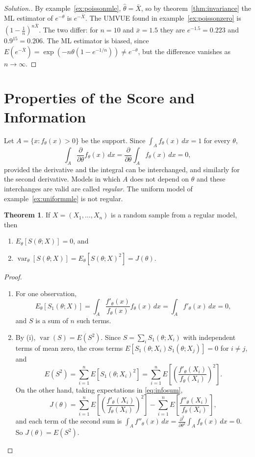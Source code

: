 \documentclass[12pt,a4paper]{report}
\theoremstyle{definition}
\newtheorem{thm}{Theorem}[section]
\DeclareMathOperator{\var}{var}
\newenvironment{solution}
  {\renewcommand{\qedsymbol}{}\begin{proof}[\textit{Solution}.]}
  {\end{proof}}
\begin{document}
\begin{solution}
By example~\ref{ex:poissonmle}, $\hat\theta = \bar X$, so by
theorem~\ref{thm:invariance} the ML estimator of $e^{-\theta}$ is $e^{-\bar X}$. The
UMVUE found in example~\ref{ex:poissonzero} is $\left(1 - \frac1n\right)^{n\bar X}$. The
two differ: for $n = 10$ and $\bar x = 1.5$ they are $e^{-1.5} = 0.223$ and
$0.9^{15} = 0.206$. The ML estimator is biased, since
$E\left(e^{-\bar X}\right) = \exp\left(-n\theta(1 - e^{-1/n})\right)\ne e^{-\theta}$, but
the difference vanishes as $n\to\infty$.
\end{solution}

\section{Properties of the Score and Information}

Let $A = \{x : f_\theta(x)>0\}$ be the support. Since $\int_A f_\theta(x)\,dx = 1$
for every $\theta$,
\[\int_A\frac{\partial}{\partial\theta}f_\theta(x)\,dx = \frac{\partial}{\partial\theta}\int_A f_\theta(x)\,dx = 0,\]
provided the derivative and the integral can be interchanged, and similarly for
the second derivative. Models in which $A$ does not depend on $\theta$ and these
interchanges are valid are called \emph{regular}. The uniform model of
example~\ref{ex:uniformmle} is not regular.

\begin{thm}
\label{thm:scoreproperties}
If $X = (X_1, \dots, X_n)$ is a random sample from a regular model, then
\begin{enumerate}
\item[(i)] $E_\theta\left[S(\theta; X)\right] = 0$, and
\item[(ii)] $\var_\theta\left[S(\theta; X)\right] = E_\theta\left[S(\theta; X)^2\right] = J(\theta)$.
\end{enumerate}
\end{thm}

\begin{proof}
\begin{enumerate}
\item[(i)] For one observation,
\[E_\theta\left[S_1(\theta; X)\right] = \int_A\frac{f'_\theta(x)}{f_\theta(x)}f_\theta(x)\,dx
= \int_A f'_\theta(x)\,dx = 0 ,\]
and $S$ is a sum of $n$ such terms.
\item[(ii)] By (i), $\var(S) = E(S^2)$. Since $S = \sum_i S_1(\theta; X_i)$ with
independent terms of mean zero, the cross terms
$E\left[S_1(\theta; X_i)S_1(\theta; X_j)\right] = 0$ for $i\ne j$, and
\[E(S^2) = \sum_{i=1}^n E\left[S_1(\theta; X_i)^2\right]
= \sum_{i=1}^n E\left[\left(\frac{f'_\theta(X_i)}{f_\theta(X_i)}\right)^2\right].\]
On the other hand, taking expectations in \eqref{eq:infosum},
\[J(\theta) = \sum_{i=1}^n E\left[\left(\frac{f'_\theta(X_i)}{f_\theta(X_i)}\right)^2\right]
- \sum_{i=1}^n E\left[\frac{f''_\theta(X_i)}{f_\theta(X_i)}\right],\]
and each term of the second sum is
$\int_A f''_\theta(x)\,dx = \frac{\partial^2}{\partial\theta^2}\int_A f_\theta(x)\,dx = 0$.
So $J(\theta) = E(S^2)$.
\end{enumerate}
\end{proof}
\end{document}
